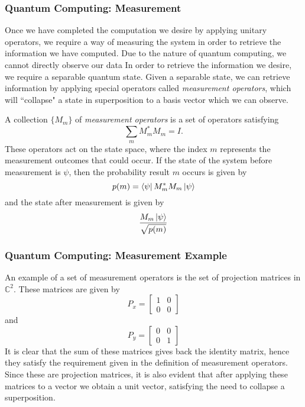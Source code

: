\documentclass{beamer}
\renewcommand{\bra}{\Bra}
\renewcommand{\ket}{\Ket}
\renewcommand{\bra}{\Bra}
\renewcommand{\ket}{\Ket}
\newcommand{\bb}[1]{\mathbb{#1}}
\begin{document}
\begin{frame}
\frametitle{Quantum Computing: Measurement}
        Once we have completed the computation we desire by applying unitary operators, we require a way of measuring the system in order to retrieve the information we have computed.
        Due to the nature of quantum computing, we cannot directly observe our data
        In order to retrieve the information we desire, we require a separable quantum state.
        Given a separable state, we can retrieve information by applying special operators called \textit{measurement operators}, which will ``collapse" a state in superposition to a basis vector which we can observe.
        \begin{definition}\label{def:measurement_operator}
            A collection $\{M_m\}$ of \textit{measurement operators} is a set of operators satisfying $$\sum_m M_m^* M_m = I.$$ 
            These operators act on the state space, where the index $m$ represents the measurement outcomes that could occur. 
            If the state of the system before measurement is $\psi$, then the probability result $m$ occurs is given by $$p(m) = \bra{\psi}M_m^* M_m \ket{\psi}$$ and the state after measurement is given by $$\frac{M_m \ket{\psi}}{\sqrt{p(m)}}$$
        \end{definition}
\end{frame}

\begin{frame}
\frametitle{Quantum Computing: Measurement Example}
        \begin{example}
            An example of a set of measurement operators is the set of projection matrices in $\bb{C}^{2}$.
            These matrices are given by $$P_x = \begin{bmatrix} 1 & 0 \\ 0 & 0 \end{bmatrix}$$ and $$P_y = \begin{bmatrix} 0 & 0 \\ 0 & 1 \end{bmatrix}$$
            It is clear that the sum of these matrices gives back the identity matrix, hence they satisfy the requirement given in the definition of measurement operators.\\
            Since these are projection matrices, it is also evident that after applying these matrices to a vector we obtain a unit vector, satisfying the need to collapse a superposition.
        \end{example}
\end{frame}
\end{document}

